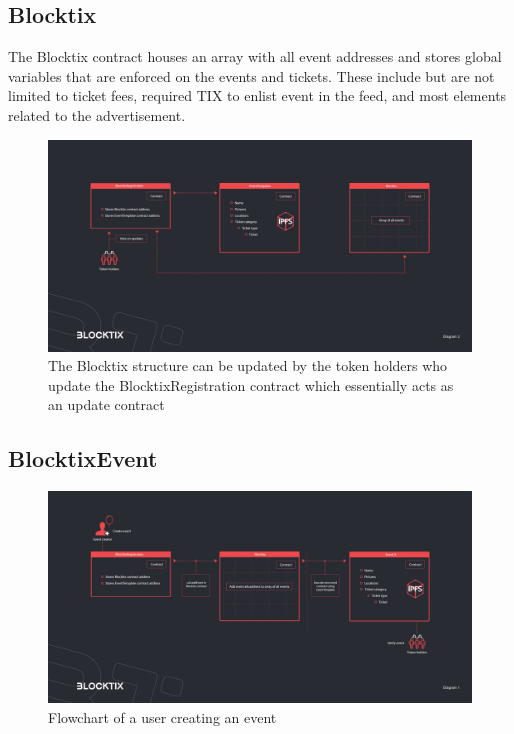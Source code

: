 \documentclass[a4paper]{article}
\begin{document}
\subsection{Blocktix}
The Blocktix contract houses an array with all event addresses and stores global variables that are enforced on the events and tickets. These include but are not limited to ticket fees, required TIX to enlist event in the feed, and most elements related to the advertisement. 

\begin{figure}
\centering
\includegraphics[scale=0.22]{BTX-Diagram-2.jpg}
\caption{\label{fig:BTX-Diagram-2}The Blocktix structure can be updated by the token holders who update the BlocktixRegistration contract which essentially acts as an update contract}
\end{figure}

\subsection{BlocktixEvent}

\begin{figure}
\centering
\includegraphics[scale=0.22]{BTX-Diagram-1.jpg}
\caption{\label{fig:BTX-Diagram-1}Flowchart of a user creating an event}
\end{figure}
\end{document}

